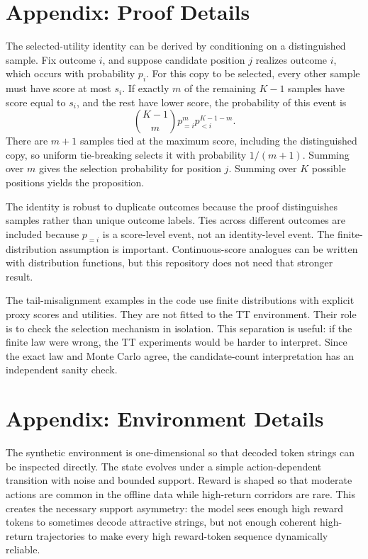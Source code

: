 \documentclass{article}
\begin{document}
\section{Appendix: Proof Details}

The selected-utility identity can be derived by conditioning on a distinguished sample. Fix outcome \(i\), and suppose candidate position \(j\) realizes outcome \(i\), which occurs with probability \(p_i\). For this copy to be selected, every other sample must have score at most \(s_i\). If exactly \(m\) of the remaining \(K-1\) samples have score equal to \(s_i\), and the rest have lower score, the probability of this event is
\[
\binom{K-1}{m}p_{=i}^{m}p_{<i}^{K-1-m}.
\]
There are \(m+1\) samples tied at the maximum score, including the distinguished copy, so uniform tie-breaking selects it with probability \(1/(m+1)\). Summing over \(m\) gives the selection probability for position \(j\). Summing over \(K\) possible positions yields the proposition.

The identity is robust to duplicate outcomes because the proof distinguishes samples rather than unique outcome labels. Ties across different outcomes are included because \(p_{=i}\) is a score-level event, not an identity-level event. The finite-distribution assumption is important. Continuous-score analogues can be written with distribution functions, but this repository does not need that stronger result.

The tail-misalignment examples in the code use finite distributions with explicit proxy scores and utilities. They are not fitted to the TT environment. Their role is to check the selection mechanism in isolation. This separation is useful: if the finite law were wrong, the TT experiments would be harder to interpret. Since the exact law and Monte Carlo agree, the candidate-count interpretation has an independent sanity check.

\section{Appendix: Environment Details}

The synthetic environment is one-dimensional so that decoded token strings can be inspected directly. The state evolves under a simple action-dependent transition with noise and bounded support. Reward is shaped so that moderate actions are common in the offline data while high-return corridors are rare. This creates the necessary support asymmetry: the model sees enough high reward tokens to sometimes decode attractive strings, but not enough coherent high-return trajectories to make every high reward-token sequence dynamically reliable.
\end{document}
